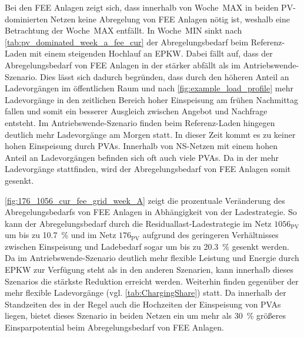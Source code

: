 Bei den \gls{FEE} Anlagen zeigt sich, dass innerhalb von Woche~MAX in beiden \gls{PV}-dominierten Netzen keine Abregelung von \gls{FEE} Anlagen nötig ist, weshalb eine Betrachtung der Woche~MAX entfällt.
In Woche~MIN sinkt nach \autoref{tab:pv_dominated_week_a_fee_cur} der Abregelungsbedarf beim Referenz-Laden mit einem steigenden Hochlauf an \gls{EPKW}.
Dabei fällt auf, dass der Abregelungsbedarf von \gls{FEE} Anlagen in der \SzeFirmenparkplatz stärker abfällt als im Antriebswende-Szenario.
Dies lässt sich dadurch begründen, dass durch den höheren Anteil an Ladevorgängen im öffentlichen Raum und \zH nach \autoref{fig:example_load_profile} mehr Ladevorgänge in den zeitlichen Bereich hoher Einspeisung am frühen Nachmittag fallen und somit ein besserer Ausgleich zwischen Angebot und Nachfrage entsteht.
Im Antriebswende-Szenario finden beim Referenz-Laden hingegen deutlich mehr Ladevorgänge am Morgen statt.
In dieser Zeit kommt es zu keiner hohen Einspeisung durch \glspl{PVA}.
Innerhalb von \gls{NS}-Netzen mit einem hohen Anteil an Ladevorgängen \zH befinden sich oft auch viele \glspl{PVA}.
Da in der \SzeFirmenparkplatz mehr Ladevorgänge \zH stattfinden, wird der Abregelungsbedarf von \gls{FEE} Anlagen somit gesenkt.



\autoref{fig:176_1056_cur_fee_grid_week_A} zeigt die prozentuale Veränderung des Abregelungsbedarfs von \gls{FEE} Anlagen in Abhängigkeit von der Ladestrategie.
So kann der Abregelungsbedarf durch die Residuallast-Ladestrategie im Netz \(1056_{\text{PV}}\) um bis zu \SI{10.7}{\percent} und im Netz \(176_{\text{PV}}\) aufgrund des geringeren Verhältnisses zwischen Einspeisung und Ladebedarf sogar um bis zu \SI{20.3}{\percent} gesenkt werden.
Da im Antriebswende-Szenario deutlich mehr flexible Leistung und Energie durch \gls{EPKW} zur Verfügung steht als in den anderen Szenarien, kann innerhalb dieses Szenarios die stärkste Reduktion erreicht werden.
Weiterhin finden gegenüber der \SzeFirmenparkplatz mehr flexible Ladevorgänge (vgl. \autoref{tab:ChargingShare}) statt.
Da innerhalb der Standzeiten des \UC \Firmeparkplatz in der Regel auch die Hochzeiten der Einspeisung von \glspl{PVA} liegen, bietet dieses Szenario in beiden Netzen ein um mehr als \SI{30}{\percent} größeres Einsparpotential beim Abregelungsbedarf von \gls{FEE} Anlagen.




